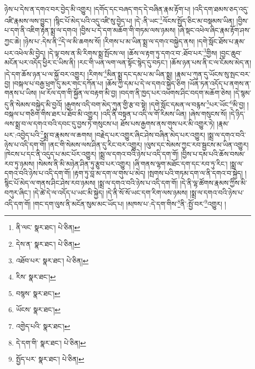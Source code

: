 ཉེས་པ་དེས་ན་དགའ་བར་བྱེད་མི་འགྱུར། །དགོད་དང་བཞད་གད་དེ་བཞིན་རྣམ་རྟོག་པ། །འདི་དག་ཐམས་ཅད་འདུ་འཛི་རྣམས་ལས་བྱུང་། །སྙིང་པོ་མེད་པའི་འདུ་འཛི་སུ་བྱེད་པ། །དེ་:ནི་ཡང་\footnote{ནི་ལང་  སྣར་ཐང་།  པེ་ཅིན། }ལོངས་སྤྱོད་ཅིང་མ་བསྡམས་ཡིན། །བྱིས་པ་དག་ནི་འཇིག་རྟེན་སྨྲ་ལ་དགའ། །བྱིས་པ་དེ་དག་མཆོག་གི་གཏམ་ལས་ཉམས། །ཞེ་སྡང་འཕེལ་ཞིང་རྣམ་རྟོག་ཤས་ཀྱང་ཆེ། །ཉེས་པ་:དེས་ནི་\footnote{དེས་ན་  སྣར་ཐང་།  པེ་ཅིན། }དེ་ལ་མི་ཆགས་སོ། །རིགས་པ་མ་ཡིན་སྨྲ་ལ་དགའ་བསྐྱེད་ནས། །དགེ་སློང་ཐོས་པ་རྣམ་པར་འཕེལ་མི་བྱེད། །དེ་ལྟ་བས་ན་མི་རིགས་སྨྲ་སྤོངས་ལ། །ཆོས་ལ་རྟག་ཏུ་དགའ་བ་:ཐོབ་པར་\footnote{འཐོབ་པར་  སྣར་ཐང་།  པེ་ཅིན། }གྱིས། །བྱང་ཆུབ་མངོན་པར་འདོད་ཕྱིར་ང་ཡིས་ནི། །རང་གི་ཡན་ལག་ལན་སྟོང་སྙེད་དུ་བཏང་། །ཆོས་ཉན་པས་ནི་ང་ལ་ངོམས་མེད་ན། །དེ་དག་ཆོས་ཉན་པ་ལ་སྐྱོ་བར་འགྱུར། །རིགས་\footnote{རིས་  སྣར་ཐང་། }མིན་སྨྲ་དང་དམ་པ་མ་ཡིན་སྨྲ། །རྣམ་པ་ཀུན་དུ་ཡོངས་སུ་སྤང་བར་བྱ། །བསྐལ་པ་བརྒྱ་ཕྲག་དུ་མར་གང་དཀོན་པ། །ཆོས་ཀྱི་དམ་པ་དེ་ལ་དགའ་སྐྱེད་ཅིག །ཡོན་ཏན་འདོད་པ་ནགས་ན་གནས་པ་ཡིས། །ཕ་རོལ་དག་གི་སྐྱོན་ལ་བརྟག་མི་བྱ། །བདག་ནི་ཁྱད་པར་འཕགས་ཤིང་བདག་མཆོག་ཅེས། །དེ་སྙམ་དུ་ནི་སེམས་བསྐྱེད་མི་བྱའོ། །རྒྱགས་འདི་བག་མེད་ཀུན་གྱི་རྩ་བ་སྟེ། །དགེ་སློང་དམན་ལ་བརྙས་\footnote{བསྙས་  སྣར་ཐང་། }པར་ཡོང་\footnote{ཡོངས་  སྣར་ཐང་། }མི་བྱ། །བསྐལ་པ་གཅིག་གིས་ཐར་པ་ཐོབ་མི་འགྱུར། །འདི་ནི་བསྟན་པ་འདི་ལ་གོ་རིམས་ཡིན། །ཞེས་གསུངས་སོ། །དེ་ཉིད་ལས་སྨྲ་བ་ལ་དགའ་བའི་དབང་དུ་བྱས་ཏེ་གསུངས་པ། ཐོས་པས་རྒྱགས་ནས་གུས་པར་མི་འགྱུར་ཏེ། །རྣམ་པར་:འབྱེད་པའི་\footnote{འགྱེད་པའི་  སྣར་ཐང་། }སྨྲ་བ་རྣམས་ལ་ཆགས། །བརྗེད་པར་འགྱུར་ཞིང་ཤེས་བཞིན་མེད་པར་འགྱུར། །སྨྲ་ལ་དགའ་བའི་ཉེས་པ་འདི་དག་གོ། །ནང་གི་སེམས་ལས་ཤིན་དུ་རིང་བར་འགྱུར། །ལུས་དང་སེམས་ཀྱང་རབ་སྦྱངས་མ་ཡིན་འགྱུར། །ཁེངས་པ་དང་ནི་འདུད་པ་མང་པོར་འགྱུར། །སྨྲ་ལ་དགའ་བའི་ཉེས་པ་འདི་དག་གོ། །བྱིས་པ་དམ་པའི་ཆོས་བསམ་རབ་ཏུ་ཉམས། །སེམས་ནི་མི་མཉེན་ཤིན་ཏུ་རྩུབ་པར་འགྱུར། །ཞི་གནས་ལྷག་མཐོང་དག་དང་རབ་ཏུ་རིང་། །སྨྲ་ལ་དགའ་བའི་ཉེས་པ་འདི་དག་གོ། །རྟག་ཏུ་བླ་མ་དག་ལ་གུས་པ་མེད། །སྤགས་པའི་གཏམ་དག་ལ་ནི་དགའ་བ་སྐྱེད། །སྙིང་པོ་མེད་ལ་གནས་ཤིང་ཤེས་རབ་ཉམས། །སྨྲ་ལ་དགའ་བའི་ཉེས་པ་འདི་དག་གོ། །དེ་ནི་ལྷ་ཚོགས་རྣམས་ཀྱིས་མི་བཀུར་ཞིང་། །དེ་ཚེ་དེ་ལ་འདོད་པ་ཡང་མི་སྐྱེད། །དེ་ནི་སོ་སོ་ཡང་དག་རིག་ལས་ཉམས། །སྨྲ་ལ་དགའ་བའི་ཉེས་པ་འདི་དག་གོ། །གང་དག་ལུས་ནི་མངོན་སུམ་མང་ཡོད་པ། །མཁས་པ་:དེ་དག་གིས་\footnote{དེ་དག་གི་  སྣར་ཐང་།  པེ་ཅིན། }ནི་:སྤྱོ་བར་\footnote{སྤྱོད་པར་  སྣར་ཐང་།  པེ་ཅིན། }འགྱུར། །
